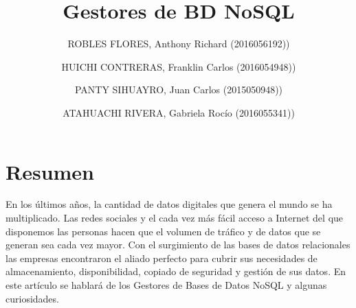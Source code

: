 \documentclass[preprint,12pt]{elsarticle}
\begin{document}
	
	\begin{frontmatter} 

		\title{\huge Gestores de BD NoSQL}
		
		\author{ROBLES FLORES, Anthony Richard     (2016056192))}
		\author{HUICHI CONTRERAS, Franklin Carlos          	(2016054948))}
		\author{PANTY SIHUAYRO, Juan Carlos         	(2015050948))}  
		\author{ATAHUACHI RIVERA, Gabriela Rocío                (2016055341))} 
		\address{Escuela Profesional de Ingeniería de Sistemas}
		\address{Universidad Privada de Tacna}
		\address{Tacna, Perú}
		

		\begin{abstract}
		


		\end{abstract}


	\end{frontmatter}


\section{Resumen}
En los últimos años, la cantidad de datos digitales que genera el mundo se ha
multiplicado. Las redes sociales y el cada vez más fácil acceso a Internet del que
disponemos las personas hacen que el volumen de tráfico y de datos que se generan sea
cada vez mayor.
Con el surgimiento de las bases de datos relacionales las empresas encontraron el aliado
perfecto para cubrir sus necesidades de almacenamiento, disponibilidad, copiado de
seguridad y gestión de sus datos.
En este artículo se hablará de los Gestores de Bases de Datos NoSQL y algunas curiosidades.




\end{document}
